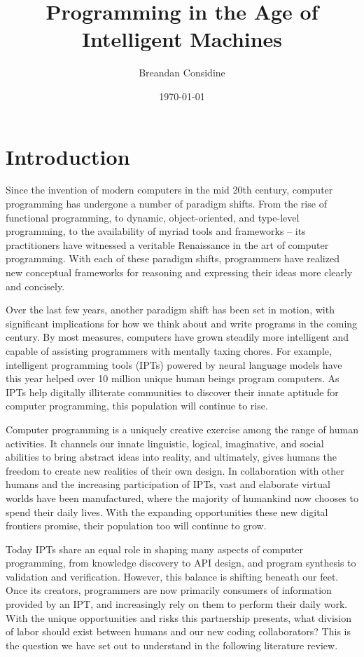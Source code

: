 \documentclass[10pt]{article}
\title{Programming in the Age of Intelligent Machines}
\author{Breandan Considine}
\date{\today}
\begin{document}
  \maketitle
  \section{Introduction}

Since the invention of modern computers in the mid 20th century, computer programming has undergone a number of paradigm shifts. From the rise of functional programming, to dynamic, object-oriented, and type-level programming, to the availability of myriad tools and frameworks -- its practitioners have witnessed a veritable Renaissance in the art of computer programming. With each of these paradigm shifts, programmers have realized new conceptual frameworks for reasoning and expressing their ideas more clearly and concisely.

Over the last few years, another paradigm shift has been set in motion, with significant implications for how we think about and write programs in the coming century. By most measures, computers have grown steadily more intelligent and capable of assisting programmers with mentally taxing chores. For example, intelligent programming tools (IPTs) powered by neural language models have this year helped over 10 million unique human beings program computers. As IPTs help digitally illiterate communities to discover their innate aptitude for computer programming, this population will continue to rise.

Computer programming is a uniquely creative exercise among the range of human activities. It channels our innate linguistic, logical, imaginative, and social abilities to bring abstract ideas into reality, and ultimately, gives humans the freedom to create new realities of their own design. In collaboration with other humans and the increasing participation of IPTs, vast and elaborate virtual worlds have been manufactured, where the majority of humankind now chooses to spend their daily lives. With the expanding opportunities these new digital frontiers promise, their population too will continue to grow.

Today IPTs share an equal role in shaping many aspects of computer programming, from knowledge discovery to API design, and program synthesis to validation and verification. However, this balance is shifting beneath our feet. Once its creators, programmers are now primarily consumers of information provided by an IPT, and increasingly rely on them to perform their daily work. With the unique opportunities and risks this partnership presents, what division of labor should exist between humans and our new coding collaborators? This is the question we have set out to understand in the following literature review.
\end{document}

